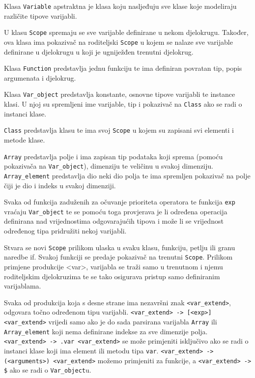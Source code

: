\documentclass[times, utf8, zavrsni]{fer}
\begin{document}
Klasa \verb|Variable| apstraktna je klasa koju nasljeđuju sve klase koje modeliraju različite tipove varijabli.

U klasu \verb|Scope| spremaju se sve varijable definirane u nekom djelokrugu. Također, ova klasa ima pokazivač na roditeljski \verb|Scope| u kojem se nalaze sve 
varijable definirane u djelokrugu u koji je ugniježđen trenutni djelokrug.

Klasa \verb|Function| predstavlja jednu funkciju te ima definiran povratan tip, popis argumenata i djelokrug. 

Klasa \verb|Var_object| predstavlja konstante, osnovne tipove varijabli te instance klasi. U njoj su spremljeni ime varijable, tip i pokazivač na \verb|Class| ako se
radi o instanci klase. 

\verb|Class| predstavlja klasu te ima svoj \verb|Scope| u kojem su zapisani svi elementi i metode klase.

\verb|Array| predstavlja polje i ima zapisan tip podataka koji sprema (pomoću pokazivača na \verb|Var_object|), dimenziju te veličinu u svakoj dimenziju.
\verb|Array_element| predstavlja dio neki dio polja te ima spremljen pokazivač na polje čiji je dio i indeks u svakoj dimenziji.

Svaka od funkcija zaduženih za očuvanje prioriteta operatora te funkcija \verb|exp| vraćaju \verb|Var_object| te se pomoću toga provjerava je li
određena operacija definirana nad vrijednostima odgovarajućih tipova i može li se vrijednost određenog tipa pridružiti nekoj varijabli.

Stvara se novi \verb|Scope| prilikom ulaska u svaku klasu, funkciju, petlju ili granu naredbe if. Svakoj funkciji se predaje pokazivač na trenutni \verb|Scope|.
Prilikom primjene produkcije <var>, varijabla se traži samo u trenutnom i njemu roditeljskim djelokruzima te se tako osigurava pristup samo definiranim varijablama.

Svaka od produkcija koja s desne strane ima nezavršni znak \linebreak \verb|<var_extend>|, odgovara točno određenom tipu varijabli. \linebreak
\verb|<var_extend> -> [<exp>] <var_extend>| vrijedi samo ako je do sada parsirana varijabla \verb|Array| ili
\verb|Array_element| koji nema definirane indekse za sve dimenzije polja. \verb|<var_extend> -> .var <var_extend>| se može primjeniti isključivo 
ako se radi o instanci klase koji ima element ili metodu tipa \verb|var|. \verb|<var_extend> -> (<arguments>) <var_extend>|
možemo primjeniti za funkcije, a \verb|<var_extend> -> $| ako se radi o \verb|Var_object|u.
\end{document}
